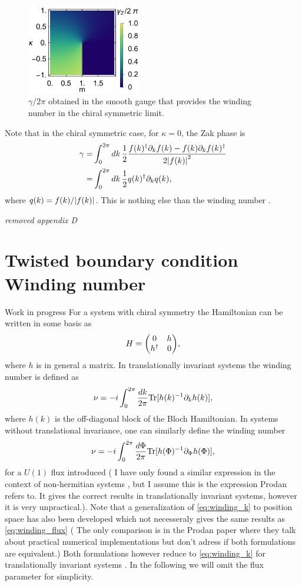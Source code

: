 \documentclass[twocolumn,amsmath,longbibliography,amssymb,superscriptaddress]{revtex4-1}
\newcommand{\carlos}[1]{{\color{red} #1}}
\newcommand{\mariac}[1]{{\it\color{cyan}#1}}
\begin{document}
\begin{figure}[t]
	\centering
	\includegraphics[width=50mm]{figApp.pdf}
	\caption{$\gamma/2\pi$ obtained in the smooth gauge that provides the winding number in the chiral symmetric limit.}
	\label{fig:ssh_zak}
\end{figure}

Note that in the chiral symmetric case, for $\kappa = 0$, the Zak phase is
\begin{align*}
\gamma =& \int_0^{2\pi} dk\,\frac{1}{2}\frac{f(k)^\dagger \partial_k f(k)-f(k)\partial_k f(k)^\dagger}{2\abs{f(k)}^2} \\
=& \int_0^{2\pi} dk\,\frac{1}{2}q(k)^\dagger \partial_k q(k),
\end{align*}
where $q(k) = f(k)/\abs{f(k)}$. This is nothing else than the winding number \cite{ryu2010topological}. 


\iffalse
\mariac{removed appendix D}
\section{Twisted boundary condition Winding number}
\carlos{Work in progress}
For a system with chiral symmetry the Hamiltonian can be written in some basis as
\begin{equation}
H = \mqty(0 & h \\ h^\dagger & 0),
\end{equation}
where $h$ is in general a matrix. In translationally invariant systems the winding number is defined as 
\begin{equation}
\nu = -i\int_0^{2\pi} \frac{dk}{2\pi} {\rm Tr}[h(k)^{-1} \partial_k h(k)],
\label{eq:winding_k}
\end{equation}
where $h(k)$ is the off-diagonal block of the Bloch Hamiltonian. In systems without translational invariance, one can similarly define the winding number
\begin{equation}
\nu = -i\int_0^{2\pi} \frac{d\Phi}{2\pi} {\rm Tr}[h(\Phi)^{-1} \partial_\Phi h(\Phi)],
\label{eq:winding_flux}
\end{equation}
for a $U(1)$ flux introduced (\carlos{I have only found a similar expression in the context of non-hermitian systems \cite{Gong2018}, but I assume this is the expression Prodan refers to. It gives the correct results in translationally invariant systems, however it is very unpractical.}). Note that a generalization of \eqref{eq:winding_k} to position space has also been developed which not necesseraly gives the same results as \eqref{eq:winding_flux} (\carlos{The only comparison is in the Prodan paper where they talk about practical numerical implementations but don't adress if both formulations are equivalent.}) Both formulations however reduce to \eqref{eq:winding_k} for translationally invariant systems \cite{Gong2018}.  In the following we will omit the flux parameter for simplicity.
\end{document}
